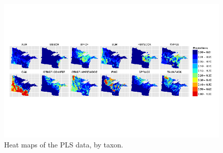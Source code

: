 \begin{figure}
\centering
\includegraphics[width=7in]{figures/maps_veg.png}
\caption{Heat maps of the PLS data, by taxon.}
\label{fig:maps_veg}
\end{figure}





